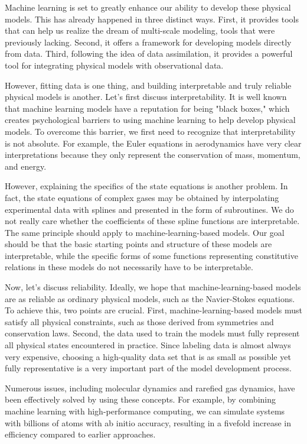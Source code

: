 Machine learning is set to greatly enhance our ability to develop these physical models. This has already happened in three distinct ways. First, it provides tools that can help us realize the dream of multi-scale modeling, tools that were previously lacking. Second, it offers a framework for developing models directly from data. Third, following the idea of data assimilation, it provides a powerful tool for integrating physical models with observational data.

However, fitting data is one thing, and building interpretable and truly reliable physical models is another. Let's first discuss interpretability. It is well known that machine learning models have a reputation for being "black boxes," which creates psychological barriers to using machine learning to help develop physical models. To overcome this barrier, we first need to recognize that interpretability is not absolute. For example, the Euler equations in aerodynamics have very clear interpretations because they only represent the conservation of mass, momentum, and energy.

However, explaining the specifics of the state equations is another problem. In fact, the state equations of complex gases may be obtained by interpolating experimental data with splines and presented in the form of subroutines. We do not really care whether the coefficients of these spline functions are interpretable. The same principle should apply to machine-learning-based models. Our goal should be that the basic starting points and structure of these models are interpretable, while the specific forms of some functions representing constitutive relations in these models do not necessarily have to be interpretable.

Now, let's discuss reliability. Ideally, we hope that machine-learning-based models are as reliable as ordinary physical models, such as the Navier-Stokes equations. To achieve this, two points are crucial. First, machine-learning-based models must satisfy all physical constraints, such as those derived from symmetries and conservation laws. Second, the data used to train the models must fully represent all physical states encountered in practice. Since labeling data is almost always very expensive, choosing a high-quality data set that is as small as possible yet fully representative is a very important part of the model development process.

Numerous issues, including molecular dynamics and rarefied gas dynamics, have been effectively solved by using these concepts. For example, by combining machine learning with high-performance computing, we can simulate systems with billions of atoms with ab initio accuracy, resulting in a fivefold increase in efficiency compared to earlier approaches.

